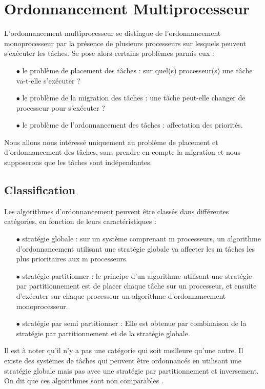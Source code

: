 \section{Ordonnancement Multiprocesseur}
\vspace{-1cm}
L'ordonnancement multiprocesseur se distingue de l'ordonnancement monoprocesseur par la présence de plusieurs processeurs sur lesquels peuvent s'exécuter les tâches. Se pose alors certains problèmes parmis eux :
\begin{itemize}
\item[$\bullet$] le problème de placement des tâches : sur quel(s) processeur(s) une tâche va-t-elle s'exécuter ?
\item[$\bullet$] le problème de la migration des tâches : une tâche peut-elle changer de processeur pour s'exécuter ?
\item[$\bullet$] le problème de l'ordonnancement des tâches : affectation des priorités.
\end{itemize}

Nous allons nous intéressé uniquement au problème de placement et d'ordonnancement des tâches, sans prendre en compte la migration et nous supposerons que les tâches sont indépendantes.

\subsection{Classification}
\vspace{-1cm}
Les algorithmes d'ordonnancement peuvent être classés dans différentes catégories, en fonction de leurs caractéristiques :
\begin{itemize}
\item[$\bullet$] stratégie globale : sur un système comprenant m processeurs, un algorithme d'ordonnancement utilisant une stratégie globale va affecter les m tâches les plus prioritaires aux m processeurs.
\item[$\bullet$] stratégie partitionner : le principe d'un algorithme utilisant une stratégie par partitionnement est de placer chaque tâche sur un processeur, et ensuite d'exécuter sur chaque processeur un algorithme d'ordonnancement monoprocesseur.
\item[$\bullet$] stratégie par semi partitionner : Elle est obtenue par combinaison de la stratégie par partitionnement et de la stratégie globale.
\end{itemize}
\indent Il est à noter qu'il n'y a pas une catégorie qui soit meilleure qu'une autre. Il existe des systèmes de tâches qui peuvent être ordonnancés en utilisant une stratégie globale mais pas avec une stratégie par partitionnement et inversement. On dit que ces algorithmes sont non comparables \cite{LW82}.

